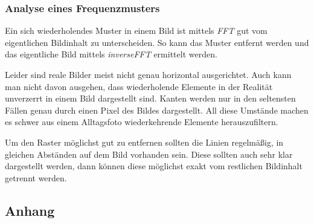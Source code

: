 \documentclass[12pt,german]{article}
\begin{document}
\subsubsection{Analyse eines Frequenzmusters}
Ein sich wiederholendes Muster in einem Bild ist mittels \textit{FFT} gut vom eigentlichen Bildinhalt zu unterscheiden. So kann das Muster entfernt werden und das eigentliche Bild mittels \textit{inverseFFT} ermittelt werden.

Leider sind reale Bilder meist nicht genau horizontal ausgerichtet. Auch kann man nicht davon ausgehen, dass  wiederholende Elemente in der Realität unverzerrt in einem Bild dargestellt sind. Kanten werden nur in den seltensten Fällen genau durch einen Pixel des Bildes dargestellt. All diese Umstände machen es schwer aus einem Alltagsfoto wiederkehrende Elemente herauszufiltern. 

Um den Raster  möglichst gut zu entfernen sollten die Linien regelmäßig, in gleichen Abständen auf dem Bild vorhanden sein. Diese sollten auch sehr klar dargestellt werden, dann können diese möglichst exakt vom restlichen Bildinhalt getrennt werden.





\subsection{Anhang}

\end{document}
